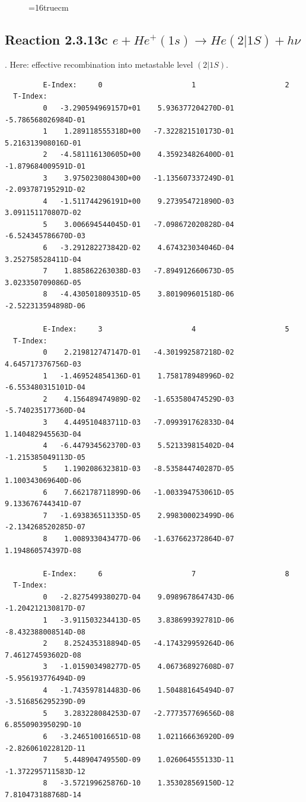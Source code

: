 \documentclass[12pt,dvips]{article}
\begin{document}
\begin{figure} \label{2.3.13b}
\epsfxsize=16truecm
\end{figure}
\newpage

\subsection{
Reaction 2.3.13c $ e + He^+(1s) \rightarrow He(2|1S) + h\nu$
}

\cite{kn:Fujimoto}. Here: effective recombination into metastable level
$(2|1S)$.

\begin{small}\begin{verbatim}
         E-Index:     0                     1                     2
  T-Index:
         0   -3.290594969157D+01    5.936377204270D-01   -5.786568026984D-01
         1    1.289118555318D+00   -7.322821510173D-01    5.216313908016D-01
         2   -4.581116130605D+00    4.359234826400D-01   -1.879684009591D-01
         3    3.975023080430D+00   -1.135607337249D-01   -2.093787195291D-02
         4   -1.511744296191D+00    9.273954721890D-03    3.091151170807D-02
         5    3.006694544045D-01   -7.098672020828D-04   -6.524345786670D-03
         6   -3.291282273842D-02    4.674323034046D-04    3.252758528411D-04
         7    1.885862263038D-03   -7.894912660673D-05    3.023350709086D-05
         8   -4.430501809351D-05    3.801909601518D-06   -2.522313594898D-06

         E-Index:     3                     4                     5
  T-Index:
         0    2.219812747147D-01   -4.301992587218D-02    4.645717376756D-03
         1   -1.469524854136D-01    1.758178948996D-02   -6.553480315101D-04
         2    4.156489474989D-02   -1.653580474529D-03   -5.740235177360D-04
         3    4.449510483711D-03   -7.099391762833D-04    1.140482945563D-04
         4   -6.447934562370D-03    5.521339815402D-04   -1.215385049113D-05
         5    1.190208632381D-03   -8.535844740287D-05    1.100343069640D-06
         6    7.662178711899D-06   -1.003394753061D-05    9.133676744341D-07
         7   -1.693836511335D-05    2.998300023499D-06   -2.134268520285D-07
         8    1.008933043477D-06   -1.637662372864D-07    1.194860574397D-08

         E-Index:     6                     7                     8
  T-Index:
         0   -2.827549938027D-04    9.098967864743D-06   -1.204212130817D-07
         1   -3.911503234413D-05    3.838699392781D-06   -8.432388008514D-08
         2    8.252435318894D-05   -4.174329959264D-06    7.461274593602D-08
         3   -1.015903498277D-05    4.067368927608D-07   -5.956193776494D-09
         4   -1.743597814483D-06    1.504881645494D-07   -3.516856295239D-09
         5    3.283228084253D-07   -2.777357769656D-08    6.855090395029D-10
         6   -3.246510016651D-08    1.021166636920D-09   -2.826061022812D-11
         7    5.448904749550D-09    1.026064555133D-11   -1.372295711583D-12
         8   -3.572199625876D-10    1.353028569150D-12    7.810473188768D-14


\end{verbatim}
\end{small}
\end{document}
